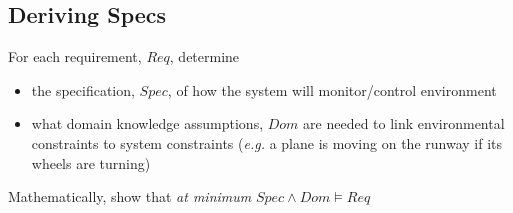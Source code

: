 \documentclass[]{article}
\theoremstyle{definition}
\begin{document}
	\subsection{Deriving Specs}
	For each requirement, $Req$, determine
	\begin{itemize}
		\item the specification, $Spec$, of how the system will monitor/control environment
		\item what domain knowledge assumptions, $Dom$ are needed to link environmental constraints to system constraints (\textit{e.g.} a plane is moving on the runway if its wheels are turning)
	\end{itemize}
	Mathematically, show that \textit{at minimum} $Spec \wedge Dom \models Req$
\end{document}

